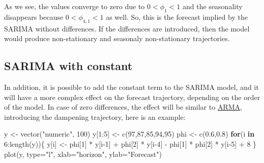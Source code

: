 \documentclass[
]{book}
\newenvironment{Shaded}{\begin{snugshade}}{\end{snugshade}}
\newcommand{\AttributeTok}[1]{\textcolor[rgb]{0.77,0.63,0.00}{#1}}
\newcommand{\ControlFlowTok}[1]{\textcolor[rgb]{0.13,0.29,0.53}{\textbf{#1}}}
\newcommand{\DecValTok}[1]{\textcolor[rgb]{0.00,0.00,0.81}{#1}}
\newcommand{\FloatTok}[1]{\textcolor[rgb]{0.00,0.00,0.81}{#1}}
\newcommand{\FunctionTok}[1]{\textcolor[rgb]{0.00,0.00,0.00}{#1}}
\newcommand{\NormalTok}[1]{#1}
\newcommand{\OtherTok}[1]{\textcolor[rgb]{0.56,0.35,0.01}{#1}}
\newcommand{\SpecialCharTok}[1]{\textcolor[rgb]{0.00,0.00,0.00}{#1}}
\newcommand{\StringTok}[1]{\textcolor[rgb]{0.31,0.60,0.02}{#1}}
\theoremstyle{definition}
\theoremstyle{definition}
\theoremstyle{definition}
\theoremstyle{definition}
\theoremstyle{remark}
\begin{document}
As we see, the values converge to zero due to \(0<\phi_1<1\) and the seasonality disappears because \(0<\phi_{4,1}<1\) as well. So, this is the forecast implied by the SARIMA without differences. If the differences are introduced, then the model would produce non-stationary and seasonaly non-stationary trajectories.

\hypertarget{sarima-with-constant}{%
\subsection{SARIMA with constant}\label{sarima-with-constant}}

In addition, it is possible to add the constant term to the SARIMA model, and it will have a more complex effect on the forecast trajectory, depending on the order of the model. In case of zero differences, the effect will be similar to \protect\hyperlink{ARMAConstant}{ARMA}, introducing the dampening trajectory, here is an example:

\begin{Shaded}
\begin{Highlighting}[]
\NormalTok{y }\OtherTok{\textless{}{-}} \FunctionTok{vector}\NormalTok{(}\StringTok{"numeric"}\NormalTok{, }\DecValTok{100}\NormalTok{)}
\NormalTok{y[}\DecValTok{1}\SpecialCharTok{:}\DecValTok{5}\NormalTok{] }\OtherTok{\textless{}{-}} \FunctionTok{c}\NormalTok{(}\DecValTok{97}\NormalTok{,}\DecValTok{87}\NormalTok{,}\DecValTok{85}\NormalTok{,}\DecValTok{94}\NormalTok{,}\DecValTok{95}\NormalTok{)}
\NormalTok{phi }\OtherTok{\textless{}{-}} \FunctionTok{c}\NormalTok{(}\FloatTok{0.6}\NormalTok{,}\FloatTok{0.8}\NormalTok{)}
\ControlFlowTok{for}\NormalTok{(i }\ControlFlowTok{in} \DecValTok{6}\SpecialCharTok{:}\FunctionTok{length}\NormalTok{(y))\{}
\NormalTok{    y[i] }\OtherTok{\textless{}{-}}\NormalTok{ phi[}\DecValTok{1}\NormalTok{] }\SpecialCharTok{*}\NormalTok{ y[i}\DecValTok{{-}1}\NormalTok{] }\SpecialCharTok{+}\NormalTok{ phi[}\DecValTok{2}\NormalTok{] }\SpecialCharTok{*}\NormalTok{ y[i}\DecValTok{{-}4}\NormalTok{] }\SpecialCharTok{{-}}
\NormalTok{      phi[}\DecValTok{1}\NormalTok{] }\SpecialCharTok{*}\NormalTok{ phi[}\DecValTok{2}\NormalTok{] }\SpecialCharTok{*}\NormalTok{ y[i}\DecValTok{{-}5}\NormalTok{] }\SpecialCharTok{+} \DecValTok{8}
\NormalTok{\}}
\FunctionTok{plot}\NormalTok{(y, }\AttributeTok{type=}\StringTok{"l"}\NormalTok{, }\AttributeTok{xlab=}\StringTok{"horizon"}\NormalTok{, }\AttributeTok{ylab=}\StringTok{"Forecast"}\NormalTok{)}
\end{Highlighting}
\end{Shaded}
\end{document}
